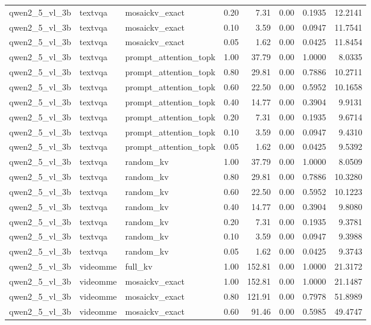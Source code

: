 \begin{longtable}{lllrrrrr}
qwen2\_5\_vl\_3b & textvqa & mosaickv\_exact & 0.20 & 7.31 & 0.00 & 0.1935 & 12.2141 \\
qwen2\_5\_vl\_3b & textvqa & mosaickv\_exact & 0.10 & 3.59 & 0.00 & 0.0947 & 11.7541 \\
qwen2\_5\_vl\_3b & textvqa & mosaickv\_exact & 0.05 & 1.62 & 0.00 & 0.0425 & 11.8454 \\
qwen2\_5\_vl\_3b & textvqa & prompt\_attention\_topk & 1.00 & 37.79 & 0.00 & 1.0000 & 8.0335 \\
qwen2\_5\_vl\_3b & textvqa & prompt\_attention\_topk & 0.80 & 29.81 & 0.00 & 0.7886 & 10.2711 \\
qwen2\_5\_vl\_3b & textvqa & prompt\_attention\_topk & 0.60 & 22.50 & 0.00 & 0.5952 & 10.1658 \\
qwen2\_5\_vl\_3b & textvqa & prompt\_attention\_topk & 0.40 & 14.77 & 0.00 & 0.3904 & 9.9131 \\
qwen2\_5\_vl\_3b & textvqa & prompt\_attention\_topk & 0.20 & 7.31 & 0.00 & 0.1935 & 9.6714 \\
qwen2\_5\_vl\_3b & textvqa & prompt\_attention\_topk & 0.10 & 3.59 & 0.00 & 0.0947 & 9.4310 \\
qwen2\_5\_vl\_3b & textvqa & prompt\_attention\_topk & 0.05 & 1.62 & 0.00 & 0.0425 & 9.5392 \\
qwen2\_5\_vl\_3b & textvqa & random\_kv & 1.00 & 37.79 & 0.00 & 1.0000 & 8.0509 \\
qwen2\_5\_vl\_3b & textvqa & random\_kv & 0.80 & 29.81 & 0.00 & 0.7886 & 10.3280 \\
qwen2\_5\_vl\_3b & textvqa & random\_kv & 0.60 & 22.50 & 0.00 & 0.5952 & 10.1223 \\
qwen2\_5\_vl\_3b & textvqa & random\_kv & 0.40 & 14.77 & 0.00 & 0.3904 & 9.8080 \\
qwen2\_5\_vl\_3b & textvqa & random\_kv & 0.20 & 7.31 & 0.00 & 0.1935 & 9.3781 \\
qwen2\_5\_vl\_3b & textvqa & random\_kv & 0.10 & 3.59 & 0.00 & 0.0947 & 9.3988 \\
qwen2\_5\_vl\_3b & textvqa & random\_kv & 0.05 & 1.62 & 0.00 & 0.0425 & 9.3743 \\
qwen2\_5\_vl\_3b & videomme & full\_kv & 1.00 & 152.81 & 0.00 & 1.0000 & 21.3172 \\
qwen2\_5\_vl\_3b & videomme & mosaickv\_exact & 1.00 & 152.81 & 0.00 & 1.0000 & 21.1487 \\
qwen2\_5\_vl\_3b & videomme & mosaickv\_exact & 0.80 & 121.91 & 0.00 & 0.7978 & 51.8989 \\
qwen2\_5\_vl\_3b & videomme & mosaickv\_exact & 0.60 & 91.46 & 0.00 & 0.5985 & 49.4747 \\

\end{longtable}
